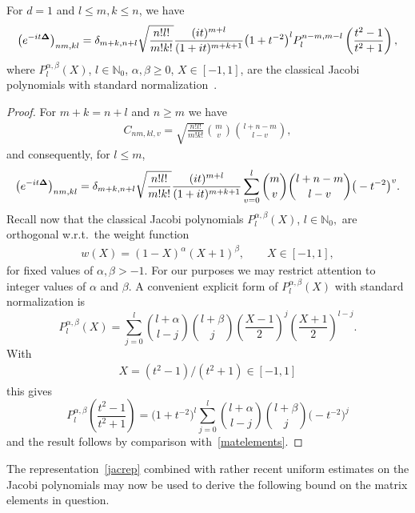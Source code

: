 \begin{lemma}
\label{jacobi}
For $d=1$ and $l\leq m,k\leq n$, we have
\begin{gather}\label{jacrep}
\left(e^{-it{\bf\Delta}}\right)_{nm,kl}=
\delta_{m+k,n+l}
\sqrt{\frac{n! l!}{m! k!}}
\frac{(it)^{m+l}}{(1+it)^{m+k+1}}\big(1+t^{-2}\big)^l
  P_{l}^{n-m,m-l}\left(\frac{t^2-1}{t^2+1}\right) ,
\end{gather}
where $P_l^{\alpha,\beta}(X)$, $l\in\mathbb N_0$, $\alpha,\beta\geq 0$,
$X\in[-1,1]$, are the classical Jacobi polynomials with standard
normalization~{\rm \cite{Szego}}.
\end{lemma}

\begin{proof}
For  $m+k=n+l$ and $n\geq m$ we have
\begin{gather*}
C_{nm,kl,v}
=\sqrt{\frac{n! l!}{m! k!}}{m\choose v}{l+n-m\choose l-v},
\end{gather*}
and consequently, for $l\leq m$,
\begin{gather}
\label{matelements}
\left(e^{-it{\bf\Delta}}\right)_{nm,kl}=
\delta_{m+k,n+l}\sqrt{\frac{n! l!}{m! k!}}
\frac{(it)^{m+l}}{(1+it)^{m+k+1}}
\sum_{v=0}^{l} {m\choose v}{l+n-m\choose l-v}
 \big(-t^{-2}\big)^{v} .
\end{gather}
Recall now \cite{Szego} that the classical Jacobi polynomials
$P_l^{\alpha,\beta}(X)$, $l\in\mathbb N_0,$ are orthogonal
w.r.t.\ the weight function
\begin{gather}\label{weight}
w(X)   =  (1-X)^\alpha(X+1)^\beta,\qquad X\in[-1,1],
\end{gather}
for f\/ixed values of $\alpha, \beta > -1$. For our purposes we may
restrict attention to integer values of $\alpha$ and  $\beta$. A  convenient
explicit form of $P_l^{\alpha,\beta}(X)$ with standard normalization is
\[
P_l^{\alpha,\beta}(X)=\sum_{j=0}^l{l+\alpha\choose l-j}{l+\beta\choose
  j}\left(\frac{X-1}{2}\right)^j\left(\frac{X+1}{2}\right)^{l-j} .
\]
With
\begin{gather}\label{X-t}
X=(t^2-1)/(t^2+1)\in [-1,1]
\end{gather}
this gives
\[
P_l^{\alpha,\beta}\left(\frac{t^2-1}{t^2+1}\right)
= \big(1+t^{-2}\big)^l\sum_{j=0}^l{l+\alpha\choose l-j}
{l+\beta\choose j}\big(-t^{-2}\big)^{j}
\]
and the result follows by comparison with~\eqref{matelements}.
\end{proof}

The representation~\eqref{jacrep} combined with rather recent
uniform estimates on the Jacobi polynomials may now be used to derive the
following bound on the matrix elements in question.

